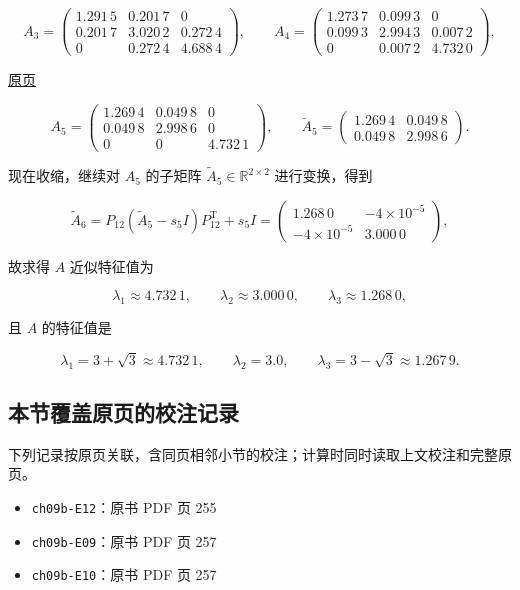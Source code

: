 \documentclass[
  10pt,
  fontset=fandol]{ctexart}
\providecommand{\tightlist}{%
  \setlength{\itemsep}{0pt}\setlength{\parskip}{0pt}}
\begin{document}
\[
A_3=\begin{pmatrix}
1.291\,5&0.201\,7&0\\
0.201\,7&3.020\,2&0.272\,4\\
0&0.272\,4&4.688\,4
\end{pmatrix},\qquad
A_4=\begin{pmatrix}
1.273\,7&0.099\,3&0\\
0.099\,3&2.994\,3&0.007\,2\\
0&0.007\,2&4.732\,0
\end{pmatrix},
\]

\href{../../source-images/pdf-259.jpeg}{原页}

\[
A_5=\begin{pmatrix}
1.269\,4&0.049\,8&0\\
0.049\,8&2.998\,6&0\\
0&0&\boxed{4.732\,1}
\end{pmatrix},\qquad
\widetilde A_5=\begin{pmatrix}1.269\,4&0.049\,8\\0.049\,8&2.998\,6\end{pmatrix}.
\]

现在收缩，继续对 \(A_5\) 的子矩阵 \(\widetilde A_5\in\mathbb R^{2\times2}\) 进行变换，得到

\[
\widetilde A_6=P_{12}(\widetilde A_5-s_5I)P_{12}^{\mathrm T}+s_5I
=\begin{pmatrix}\boxed{1.268\,0}&-4\times10^{-5}\\-4\times10^{-5}&\boxed{3.000\,0}\end{pmatrix},
\]

故求得 \(A\) 近似特征值为

\[
\lambda_1\approx4.732\,1,\qquad\lambda_2\approx3.000\,0,\qquad\lambda_3\approx1.268\,0,
\]

且 \(A\) 的特征值是

\[
\lambda_1=3+\sqrt3\approx4.732\,1,\qquad\lambda_2=3.0,\qquad\lambda_3=3-\sqrt3\approx1.267\,9.
\]

\subsection{本节覆盖原页的校注记录}\label{ux672cux8282ux8986ux76d6ux539fux9875ux7684ux6821ux6ce8ux8bb0ux5f55}

下列记录按原页关联，含同页相邻小节的校注；计算时同时读取上文校注和完整原页。

\begin{itemize}
\tightlist
\item
  \texttt{ch09b-E12}：原书 PDF 页 255
\item
  \texttt{ch09b-E09}：原书 PDF 页 257
\item
  \texttt{ch09b-E10}：原书 PDF 页 257
\end{itemize}
\end{document}
